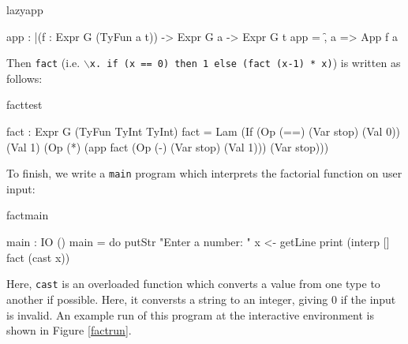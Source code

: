 \begin{SaveVerbatim}{lazyapp}
 
app : |(f : Expr G (TyFun a t)) -> Expr G a -> Expr G t
app = \f, a => App f a

\end{SaveVerbatim}

\noindent
Then \texttt{fact} 
(i.e. \texttt{$\backslash$x. if (x == 0) then 1 else (fact (x-1) * x)})
is written as follows:

\begin{SaveVerbatim}{facttest}

fact : Expr G (TyFun TyInt TyInt)
fact = Lam (If (Op (==) (Var stop) (Val 0))
               (Val 1) (Op (*) (app fact (Op (-) (Var stop) (Val 1))) 
                               (Var stop)))

\end{SaveVerbatim}

To finish, we write a \texttt{main} program which interprets the factorial function
on user input:

\begin{SaveVerbatim}{factmain}

main : IO ()
main = do putStr "Enter a number: "
          x <- getLine
          print (interp [] fact (cast x)) 

\end{SaveVerbatim}

\noindent
Here, \texttt{cast} is an overloaded function which converts a value from one
type to another if possible. Here, it conversts a string to
an integer, giving 0 if the input is invalid. An example run of this program
at the \Idris{} interactive environment is shown in Figure \ref{factrun}.


